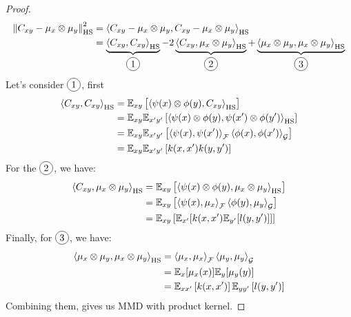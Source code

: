 \begin{proof}
    \begin{equation*}
    \begin{aligned}
        \norm{C_{xy} - \mu_x\otimes\mu_y}_{\operatorname{HS}}^2 &= \brackd{C_{xy} - \mu_x\otimes\mu_y, C_{xy} - \mu_x\otimes\mu_y}_{\operatorname{HS}} \\
        &= \underbrace{\brackd{C_{xy}, C_{xy}}_{\operatorname{HS}}}_{\circled{1}} - 2\underbrace{\brackd{C_{xy}, \mu_x\otimes\mu_y}_{\operatorname{HS}}}_{\circled{2}}  + \underbrace{\brackd{\mu_x\otimes\mu_y, \mu_x\otimes\mu_y}_{\operatorname{HS}}}_{\circled{3}}
    \end{aligned}
    \end{equation*}
    Let's consider $\circled{1}$, first
    \begin{equation*}
    \begin{aligned}
        \left\langle C_{xy}, C_{xy} \right\rangle_{\operatorname{HS}} &= \mathbb{E}_{xy}\left[ \left\langle \psi(x)\otimes \phi(y), C_{xy} \right\rangle_{\operatorname{HS}} \right] \\
        &= \mathbb{E}_{xy}\mathbb{E}_{x'y'}\left[ \left\langle \psi(x)\otimes \phi(y), \psi(x')\otimes \phi(y') \right\rangle_{\operatorname{HS}} \right] \\
        &= \mathbb{E}_{xy}\mathbb{E}_{x'y'}\left[ \left\langle \psi(x), \psi(x') \right\rangle_\mathcal{F}\left\langle \phi(x), \phi(x') \right\rangle_\mathcal{G}  \right] \\
        &= \mathbb{E}_{xy}\mathbb{E}_{x'y'}\left[ k(x, x')k(y, y') \right] \\
    \end{aligned}
    \end{equation*}
    For the $\circled{2}$, we have:
    \begin{equation*}
    \begin{aligned}
        \left\langle C_{xy}, \mu_x\otimes\mu_y \right\rangle_{\operatorname{HS}} &= \mathbb{E}_{xy}\left[ \left\langle \psi(x)\otimes \phi(y), \mu_x\otimes\mu_y \right\rangle_{\operatorname{HS}} \right] \\
        &= \mathbb{E}_{xy}\left[ \left\langle \psi(x), \mu_x \right\rangle_\mathcal{F}\left\langle \phi(y), \mu_y \right\rangle_\mathcal{G} \right] \\
        &= \mathbb{E}_{xy}\left[ \mathbb{E}_{x'}[k(x, x')\mathbb{E}_{y'}[l(y, y')]] \right] \\
    \end{aligned}
    \end{equation*}
    Finally, for $\circled{3}$, we have:
    \begin{equation*}
    \begin{aligned}
        \left\langle \mu_x\otimes\mu_y, \mu_x\otimes\mu_y \right\rangle_{\operatorname{HS}} &= \left\langle \mu_x,\mu_x \right\rangle_\mathcal{F}\left\langle \mu_y,\mu_y \right\rangle_\mathcal{G} \\
        &= \mathbb{E}_{x}[\mu_x(x)]\mathbb{E}_{y}[\mu_y(y)]\\
        &= \mathbb{E}_{xx'}\left[ k(x, x') \right]\mathbb{E}_{yy'}\left[ l(y, y') \right]
    \end{aligned}
    \end{equation*}
    Combining them, gives us MMD with product kernel.
\end{proof}

